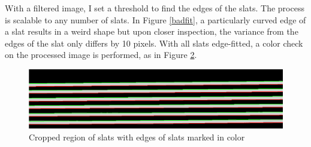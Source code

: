\documentclass[10pt]{scrartcl}
\begin{document}
With a filtered image, I set a threshold to find the edges of the slats. The process is scalable to any number of slats. In Figure \ref{badfit}, a particularly curved edge of a slat results in a weird shape but upon closer inspection, the variance from the edges of the slat only differs by 10 pixels. With all slats edge-fitted, a color check on the processed image is performed, as in Figure \ref{test}.

\begin{figure}[!ht]
{\caption{}
\label{edgefit}}
\end{figure}


\begin{figure}[!ht]
    \centering
    \includegraphics[width=\textwidth]{../plots_tables_images/lines}
    \caption{Cropped region of slats with edges of slats marked in color}
    \label{test}
\end{figure}


\end{document}
